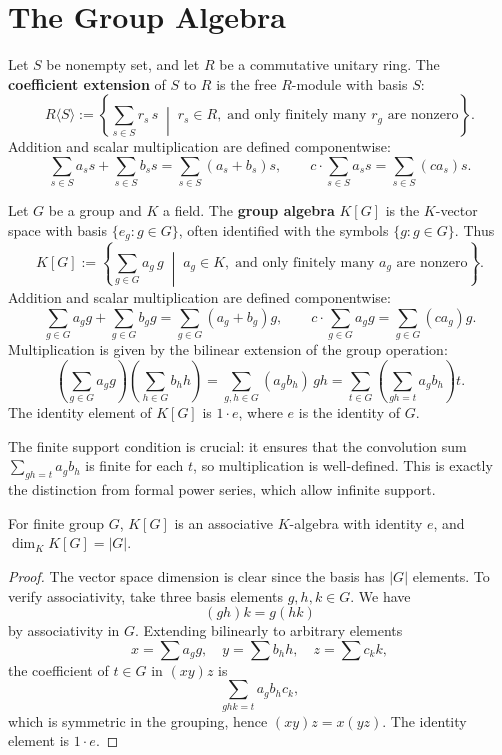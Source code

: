 


\chapter{The Group Algebra}

\begin{defn}
Let \(S\) be nonempty set, and let \(R\) be a commutative  unitary ring. The \textbf{coefficient extension} of \(S\) to \(R\) is the free \(R\)-module with basis \(S\):
\[
R\langle S \rangle := \left\{ \sum_{s \in S} r_s \, s \;\middle|\; r_s \in R,\; \text{and only finitely many } r_g \text{ are nonzero} \right\}.
\]
Addition and scalar multiplication are defined componentwise:
\[
\sum_{s \in S} a_s s + \sum_{s \in S} b_s s = \sum_{s \in S} (a_s + b_s) s, \qquad
c \cdot \sum_{s \in S} a_s s = \sum_{s \in S} (c a_s) s.
\]
\end{defn}
\begin{defn}
Let \(G\) be a group and \(K\) a field. The \textbf{group algebra} \(K[G]\) is the \(K\)-vector space with basis \(\{e_g : g \in G\}\), often identified with the symbols \(\{g : g \in G\}\). Thus
\[
K[G] := \left\{ \sum_{g \in G} a_g \, g \;\middle|\; a_g \in K,\; \text{and only finitely many } a_g \text{ are nonzero} \right\}.
\]
Addition and scalar multiplication are defined componentwise:
\[
\sum_{g \in G} a_g g + \sum_{g \in G} b_g g = \sum_{g \in G} (a_g + b_g) g, \qquad
c \cdot \sum_{g \in G} a_g g = \sum_{g \in G} (c a_g) g.
\]
Multiplication is given by the bilinear extension of the group operation:
\[
\left( \sum_{g \in G} a_g g \right) \left( \sum_{h \in G} b_h h \right)
= \sum_{g,h \in G} (a_g b_h) \, gh
= \sum_{t \in G} \left( \sum_{gh = t} a_g b_h \right) t.
\]
The identity element of \(K[G]\) is \(1 \cdot e\), where \(e\) is the identity of \(G\).
\end{defn}

\begin{remark}
The finite support condition is crucial: it ensures that the convolution sum \(\sum_{gh=t} a_g b_h\) is finite for each \(t\), so multiplication is well-defined. This is exactly the distinction from formal power series, which allow infinite support.
\end{remark}

\begin{prop}
For finite group $G$, \(K[G]\) is an associative \(K\)-algebra with identity \(e\), and \(\dim_K K[G] = |G|\).
\end{prop}

\begin{proof}
The vector space dimension is clear since the basis has \(|G|\) elements. To verify associativity, take three basis elements \(g,h,k \in G\). We have
\[
(g h) k = g (h k)
\]
by associativity in \(G\). Extending bilinearly to arbitrary elements
\[
x = \sum a_g g, \quad y = \sum b_h h, \quad z = \sum c_k k,
\]
the coefficient of \(t \in G\) in \((xy)z\) is
\[
\sum_{ghk = t} a_g b_h c_k,
\]
which is symmetric in the grouping, hence \((xy)z = x(yz)\). The identity element is \(1 \cdot e\). 
\end{proof}